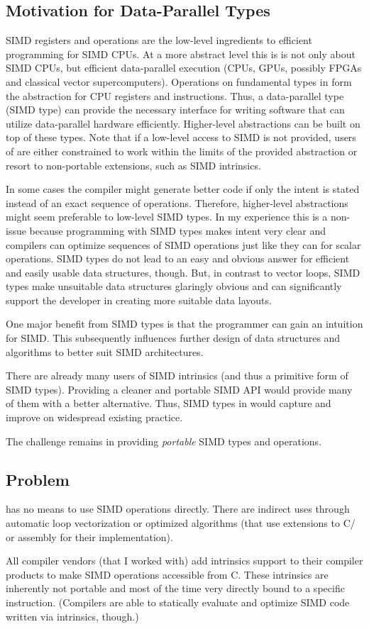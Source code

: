 \subsection{Motivation for Data-Parallel Types}
SIMD registers and operations are the low-level ingredients to efficient programming for SIMD CPUs.
At a more abstract level this is is not only about SIMD CPUs, but efficient data-parallel execution (CPUs, GPUs, possibly FPGAs and classical vector supercomputers).
Operations on fundamental types in \CC{} form the abstraction for CPU registers and instructions.
Thus, a data-parallel type (SIMD type) can provide the necessary interface for writing software that can utilize data-parallel hardware efficiently.
Higher-level abstractions can be built on top of these types.
Note that if a low-level access to SIMD is not provided, users of \CC{} are either constrained to work within the limits of the provided abstraction or resort to non-portable extensions, such as SIMD intrinsics.

In some cases the compiler might generate better code if only the intent is stated instead of an exact sequence of operations.
Therefore, higher-level abstractions might seem preferable to low-level SIMD types.
In my experience this is a non-issue because programming with SIMD types makes intent very clear and compilers can optimize sequences of SIMD operations just like they can for scalar operations.
SIMD types do not lead to an easy and obvious answer for efficient and easily usable data structures, though.
But, in contrast to vector loops, SIMD types make unsuitable data structures glaringly obvious and can significantly support the developer in creating more suitable data layouts.

One major benefit from SIMD types is that the programmer can gain an intuition for SIMD.
This subsequently influences further design of data structures and algorithms to better suit SIMD architectures.

There are already many users of SIMD intrinsics (and thus a primitive form of SIMD types).
Providing a cleaner and portable SIMD API would provide many of them with a better alternative.
Thus, SIMD types in \CC{} would capture and improve on widespread existing practice.

The challenge remains in providing \emph{portable} SIMD types and operations.

\subsection{Problem}
\CC{} has no means to use SIMD operations directly.
There are indirect uses through automatic loop vectorization or optimized algorithms (that use extensions to C/\CC{} or assembly for their implementation).

All compiler vendors (that I worked with) add intrinsics support to their compiler products to make SIMD operations accessible from C.
These intrinsics are inherently not portable and most of the time very directly bound to a specific instruction.
(Compilers are able to statically evaluate and optimize SIMD code written via intrinsics, though.)


